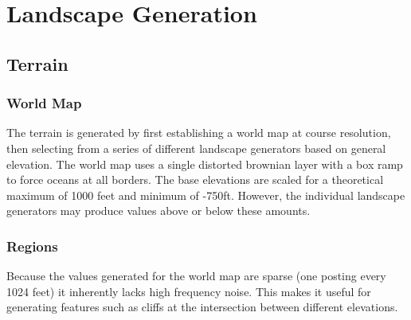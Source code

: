 
\chapter{Landscape Generation}

\section {Terrain}

\subsection{World Map}

The terrain is generated by first establishing a world map at course resolution, then selecting from a series of different landscape generators based on general elevation.
The world map uses a single distorted brownian layer with a box ramp to force oceans at all borders.
The base elevations are scaled for a theoretical maximum of 1000 feet and minimum of -750ft.
However, the individual landscape generators may produce values above or below these amounts.

\subsection{Regions}

Because the values generated for the world map are sparse (one posting every 1024 feet) it inherently lacks high frequency noise.
This makes it useful for generating features such as cliffs at the intersection between different elevations.
